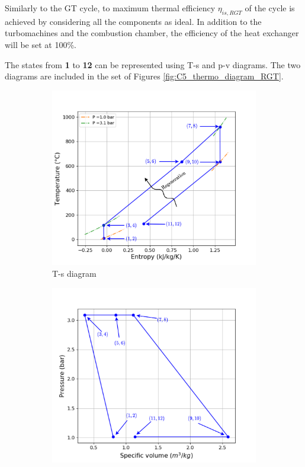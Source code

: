 Similarly to the GT cycle, to maximum thermal efficiency $\eta_{is,RGT}$ of the cycle is achieved by considering all the components as ideal. In addition to the turbomachines and the combustion chamber, the efficiency of the heat exchanger will be set at 100\%. 

The states from \textbf{1} to \textbf{12} can be represented using T-s and p-v diagrams. The two diagrams are included in the set of Figures \ref{fig:C5_thermo_diagram_RGT}.

\begin{figure}[h]
     \centering
     \begin{subfigure}[b]{0.4\textwidth}
         \centering
         \includegraphics[width=\textwidth]{Ts_RGT}
         \caption{T-s diagram}
         \label{fig:C5_Ts_RGT}
     \end{subfigure}
     \begin{subfigure}[b]{0.4\textwidth}
         \centering
         \includegraphics[width=\textwidth]{pv_RGT}

\end{subfigure}
\end{figure}
